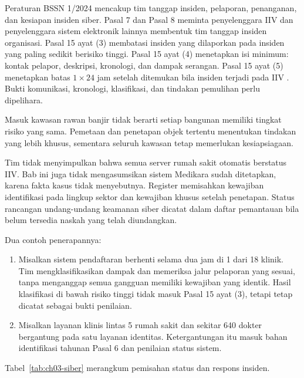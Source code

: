 Peraturan BSSN 1/2024 mencakup tim tanggap insiden, pelaporan, penanganan, dan kesiapan insiden
siber. Pasal 7 dan Pasal 8 meminta penyelenggara IIV dan penyelenggara sistem elektronik lainnya
membentuk tim tanggap insiden organisasi. Pasal 15 ayat (3) membatasi insiden yang dilaporkan pada
insiden yang paling sedikit berisiko tinggi. Pasal 15 ayat (4) menetapkan isi minimum: kontak
pelapor, deskripsi, kronologi, dan dampak serangan. Pasal 15 ayat (5) menetapkan batas $1 \times 24$
jam setelah ditemukan bila insiden terjadi pada IIV \cite{bssn1-2024}. Bukti komunikasi, kronologi,
klasifikasi, dan tindakan pemulihan perlu dipelihara.

Masuk kawasan rawan banjir tidak berarti setiap bangunan memiliki tingkat risiko yang sama. Pemetaan
dan penetapan objek tertentu menentukan tindakan yang lebih khusus, sementara seluruh kawasan tetap
memerlukan kesiapsiagaan.

Tim tidak menyimpulkan bahwa semua server rumah sakit otomatis berstatus IIV. Bab ini juga tidak
mengasumsikan sistem Medikara sudah ditetapkan, karena fakta kasus tidak menyebutnya. Register
memisahkan kewajiban identifikasi pada lingkup sektor dan kewajiban khusus setelah penetapan. Status
rancangan undang-undang keamanan siber dicatat dalam daftar pemantauan bila belum tersedia naskah
yang telah diundangkan.

Dua contoh penerapannya:
\begin{enumerate}
  \item Misalkan sistem pendaftaran berhenti selama dua jam di 1 dari 18 klinik. Tim
  mengklasifikasikan dampak dan memeriksa jalur pelaporan yang sesuai, tanpa menganggap semua
  gangguan memiliki kewajiban yang identik. Hasil klasifikasi di bawah risiko tinggi tidak masuk
  Pasal 15 ayat (3), tetapi tetap dicatat sebagai bukti penilaian.
  \item Misalkan layanan klinis lintas 5 rumah sakit dan sekitar 640 dokter bergantung pada satu
  layanan identitas. Ketergantungan itu masuk bahan identifikasi tahunan Pasal 6 dan penilaian
  status sistem.
\end{enumerate}

Tabel~\ref{tab:ch03-siber} merangkum pemisahan status dan respons insiden.

